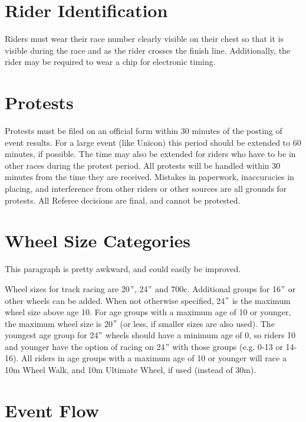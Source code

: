 \section{Rider Identification}

Riders must wear their race number clearly visible on their chest so that it is visible during the race and as the rider crosses the finish line.
Additionally, the rider may be required to wear a chip for electronic timing.

\section{Protests}

Protests must be filed on an official form within 30 minutes of the posting of event results.
For a large event (like Unicon) this period should be extended to 60 minutes, if possible.
The time may also be extended for riders who have to be in other races during the protest period.
All protests will be handled within 30 minutes from the time they are received.
Mistakes in paperwork, inaccuracies in placing, and interference from other riders or other sources are all grounds for protests.
All Referee decisions are final, and cannot be protested.

\section{Wheel Size Categories}

\begin{comment-2016}
This paragraph is pretty awkward, and could easily be improved.
\end{comment-2016}

Wheel sizes for track racing are 20$"$, 24$"$ and 700c.
Additional groups for 16$"$ or other wheels can be added.
When not otherwise specified, 24$"$ is the maximum wheel size above age 10.
For age groups with a maximum age of 10 or younger, the maximum wheel size is 20$"$ (or less, if smaller sizes are also used).
The youngest age group for 24$"$ wheels should have a minimum age of 0, so riders 10 and younger have the option of racing on 24$"$ with those groups (e.g. 0-13 or 14-16).
All riders in age groups with a maximum age of 10 or younger will race a 10m Wheel Walk, and 10m Ultimate Wheel, if used (instead of 30m).

\section{Event Flow}

